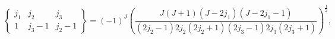 \[\begin{Bmatrix}j_{1}&j_{2}&j_{3}\\
1&j_{3}-1&j_{2}-1\end{Bmatrix}=(-1)^{J}\left(\frac{J(J+1)(J-2j_{1})(J-2j_{1}-1%
)}{(2j_{2}-1)2j_{2}(2j_{2}+1)(2j_{3}-1)2j_{3}(2j_{3}+1)}\right)^{\frac{1}{2}},\]
